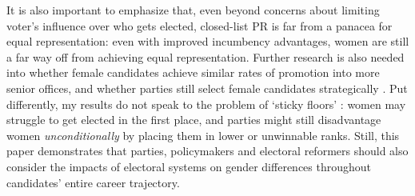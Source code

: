 \documentclass[12pt]{article}
\begin{document}
It is also important to emphasize that, even beyond concerns about limiting voter's influence over who gets elected, closed-list PR is far from a panacea for equal representation: even with improved incumbency advantages, women are still a far way off from achieving equal representation. Further research is also needed into whether female candidates achieve similar rates of promotion into more senior offices, and whether parties still select female candidates strategically \citep{verge2019parties}. Put differently, my results do not speak to the problem of `sticky floors' \citep{cipullo2021}: women may struggle to get elected in the first place, and parties might still disadvantage women \emph{unconditionally} by placing them in lower or unwinnable ranks. Still, this paper demonstrates that parties, policymakers and electoral reformers should also consider the impacts of electoral systems on gender differences throughout candidates' entire career trajectory.


\singlespacing

\setlength\bibsep{3pt}
\renewcommand*{\bibfont}{\small}


\end{document}
